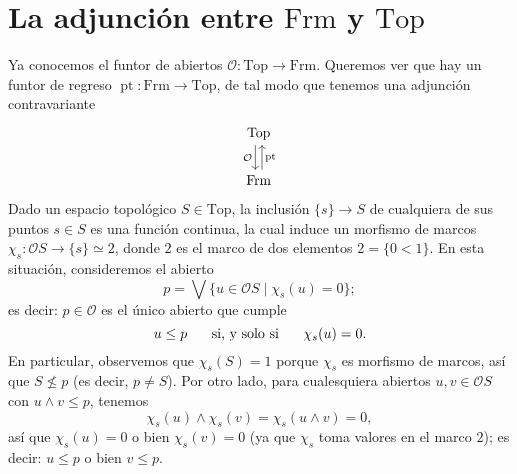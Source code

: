 \documentclass[12pt,letterpaper,titlepage]{article}
\theoremstyle{definition}
\newcommand\Sup{\bigvee}
\renewcommand\inf{\wedge}
\renewcommand\cal[1]{\mathcal{#1}}
\newcommand\ssi{\hspace{5mm}\text{ si, y solo si }\hspace{5mm}}
\newcommand\tps[2]{\texorpdfstring{#1}{#2}}
\newcommand\<{\langle}
\renewcommand\>{\rangle}
\newcommand{\Frm}{\mathrm{Frm}}
\newcommand{\Top}{\mathrm{Top}}
\DeclareMathOperator{\pt}{pt}
\begin{document}
\section{La adjunción entre \tps{$\Frm$}{Frm} y \tps{$\Top$}{Top}}

Ya conocemos el funtor de abiertos $\cal O:\Top\to\Frm$.
Queremos ver que hay un funtor de regreso $\pt:\Frm\to\Top$,
de tal modo que tenemos una adjunción contravariante
\[
\begin{tikzcd}
\Top \ar[d,shift right,"\cal O"']
\\
\Frm \ar[u,shift right,"\pt"']
\end{tikzcd}
\]
Dado un espacio topológico $S\in\Top$, la inclusión
$\{s\}\to S$ de cualquiera de sus puntos
$s\in S$ es una función continua, la
cual induce un morfismo de marcos
$\chi_s:\cal OS\to\cal\{s\}\simeq 2$,
donde $2$ es el marco de dos elementos $2=\{0<1\}$.
En esta situación, consideremos el abierto
\[
    p = \Sup\{u\in\cal OS\mid \chi_s(u)=0\}
;\]
es decir: $p\in\cal O$ es el único abierto que cumple
\[
    u\leq p \ssi \chi_s(u) = 0
.\]
En particular, observemos que $\chi_s(S)=1$
porque $\chi_s$ es morfismo de marcos, así que $S\nleq p$
(es decir, $p\neq S$).
Por otro lado, para cualesquiera abiertos $u,v\in\cal OS$ con
$u\inf v\leq p$, tenemos
\[
    \chi_s(u)\inf\chi_s(v)=\chi_s(u\inf v)=0
,\]
así que $\chi_s(u)=0$ o bien $\chi_s(v)=0$
(ya que $\chi_s$ toma valores en el marco $2$); es decir:
$u\leq p$ o bien $v\leq p$.
\end{document}
